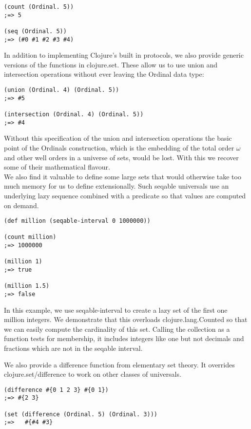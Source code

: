 \documentclass[a4paper,11pt]{report}
\begin{document}
\lstset {language=Lisp}
\begin{lstlisting}
(count (Ordinal. 5))
;=> 5

(seq (Ordinal. 5))
;=> (#0 #1 #2 #3 #4)
\end{lstlisting}

In addition to implementing Clojure's built in protocols, we also provide generic versions of the functions in clojure.set. These allow us to use union and intersection operations without ever leaving the Ordinal data type:

\lstset {language=Lisp}
\begin{lstlisting}
(union (Ordinal. 4) (Ordinal. 5))
;=> #5

(intersection (Ordinal. 4) (Ordinal. 5))
;=> #4
\end{lstlisting}

Without this specification of the union and intersection operations the basic point of the Ordinals construction, which is the embedding of the total order $\omega$ and other well orders in a universe of sets, would be lost. With this we recover some of their mathematical flavour. \\

We also find it valuable to define some large sets that would otherwise take too much memory for us to define extensionally. Such seqable universals use an underlying lazy sequence combined with a predicate so that values are computed on demand.

\lstset {language=Lisp}
\begin{lstlisting}
(def million (seqable-interval 0 1000000))

(count million) 
;=> 1000000

(million 1)
;=> true

(million 1.5)
;=> false
\end{lstlisting}

In this example, we use seqable-interval to create a lazy set of the first one million integers. We demonstrate that this overloads clojure.lang.Counted so that we can easily compute the cardinality of this set. Calling the collection as a function tests for membership, it includes integers like one but not decimals and fractions which are not in the seqable interval. 

\newpage 

We also provide a difference function from elementary set theory. It overrides clojure.set/difference to work on other classes of universals.

\lstset {language=Lisp}
\begin{lstlisting}
(difference #{0 1 2 3} #{0 1})
;=> #{2 3}

(set (difference (Ordinal. 5) (Ordinal. 3)))
;=>   #{#4 #3}
\end{lstlisting}
\end{document}
